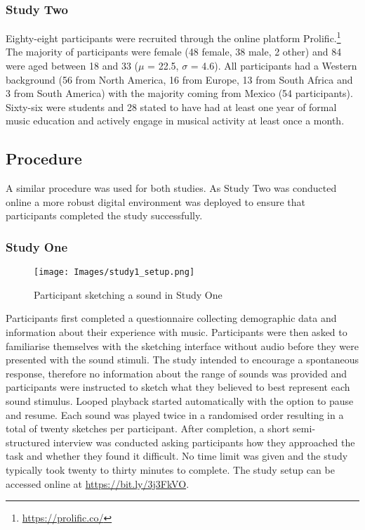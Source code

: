 \documentclass[]{interact}
\theoremstyle{plain}%
\theoremstyle{definition}
\theoremstyle{remark}
\begin{document}
\subsubsection{Study Two}\label{subsubsec:participants_two}
Eighty-eight participants were recruited through the online platform Prolific.\footnote{\url{https://prolific.co/}} The majority of participants were female (48 female, 38 male, 2 other) and 84 were aged between 18 and 33 ($\mu$ = 22.5, $\sigma$ = 4.6). All participants had a Western background (56 from North America, 16 from Europe, 13 from South Africa and 3 from South America) with the majority coming from Mexico (54 participants). Sixty-six were students and 28 stated to have had at least one year of formal music education and actively engage in musical activity at least once a month.

\subsection{Procedure}\label{subsec:procedure}
A similar procedure was used for both studies. As Study Two was conducted online a more robust digital environment was deployed to ensure that participants completed the study successfully.  

\subsubsection{Study One}\label{subsubsec:procedure_one}
\begin{figure}[h]
\centering
\texttt{[image: Images/study1\_setup.png]}
\caption{Participant sketching a sound in Study One\label{fig:study1_procedure}}
\end{figure}

Participants first completed a questionnaire collecting demographic data and information about their experience with music. Participants were then asked to familiarise themselves with the sketching interface without audio before they were presented with the sound stimuli. The study intended to encourage a spontaneous response, therefore no information about the range of sounds was provided and participants were instructed to sketch what they believed to best represent each sound stimulus. Looped playback started automatically with the option to pause and resume. Each sound was played twice in a randomised order resulting in a total of twenty sketches per participant. After completion, a short semi-structured interview was conducted asking participants how they approached the task and whether they found it difficult. No time limit was given and the study typically took twenty to thirty minutes to complete. The study setup can be accessed online at \url{https://bit.ly/3j3FkVO}.
\end{document}
